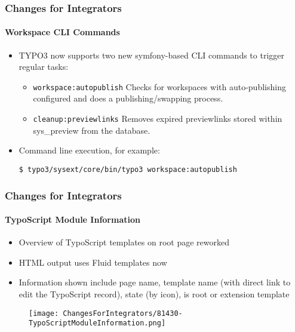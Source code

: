 
\begin{frame}[fragile]
	\frametitle{Changes for Integrators}
	\framesubtitle{Workspace CLI Commands}

	\lstset{basicstyle=\small\ttfamily}

	\begin{itemize}
		\item TYPO3 now supports two new symfony-based CLI commands to trigger
			regular tasks:

			\begin{itemize}

				\item \texttt{workspace:autopublish}\newline
					Checks for workspaces with auto-publishing configured
					and does a publishing/swapping process.
					\newline

				\item \texttt{cleanup:previewlinks}\newline
					Removes expired previewlinks stored within sys\_preview
					from the database.

			\end{itemize}

		\item Command line execution, for example:

			\begin{lstlisting}
$ typo3/sysext/core/bin/typo3 workspace:autopublish
			\end{lstlisting}

	\end{itemize}

\end{frame}


\begin{frame}[fragile]
	\frametitle{Changes for Integrators}
	\framesubtitle{TypoScript Module Information}

	\begin{itemize}
		\item Overview of TypoScript templates on root page reworked
		\item HTML output uses Fluid templates now
		\item Information shown include page name, template name (with direct
			link to edit the TypoScript record), state (by icon), is root or
			extension template

	\end{itemize}

	\begin{figure}
		\texttt{[image: ChangesForIntegrators/81430-TypoScriptModuleInformation.png]}
	\end{figure}

\end{frame}

